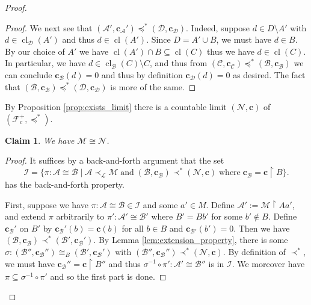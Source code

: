 \documentclass[12pt]{amsart}
\theoremstyle{plain}
\newtheorem{claim}{Claim}
\theoremstyle{definition}
\newcommand{\isom}{\cong}
\newcommand{\mcA}{\mathcal{A}}
\newcommand{\mcB}{\mathcal{B}}
\newcommand{\mcC}{\mathcal{C}}
\newcommand{\mcD}{\mathcal{D}}
\newcommand{\mcF}{\mathcal{F}}
\newcommand{\mcI}{\mathcal{I}}
\newcommand{\mcL}{\mathcal{L}}
\newcommand{\mcM}{\mathcal{M}}
\newcommand{\mcN}{\mathcal{N}}
\newcommand{\oc}{\mathbf{c}}
\DeclareMathOperator{\cl}{cl}
\begin{document}
\begin{proof}
\begin{proof}
We next see that $(\mcA', \oc_\mcA') \preceq^* (\mcD, \oc_\mcD)$.
Indeed, suppose $d \in D \setminus A'$ with $d \in \cl_\mcD(A')$ and thus $d \in \cl(A')$.
Since $D = A' \cup B$, we must have $d \in B$.
By our choice of $A'$ we have $\cl(A') \cap B \subseteq \cl(C)$ thus we have $d \in \cl(C)$.
In particular, we have $d \in \cl_\mcB(C) \setminus C$, and thus from $(\mcC, \oc_\mcC) \preceq^* (\mcB, \oc_\mcB)$ we can conclude $\oc_\mcB(d) = 0$ and thus by definition $\oc_\mcD(d) = 0$ as desired.
The fact that $(\mcB, \oc_\mcB) \preceq^* (\mcD, \oc_\mcD)$ is more of the same.
\end{proof}

By Proposition \ref{prop:exists_limit} there is a countable limit $(\mcN, \oc)$ of $(\mcF^+_c, \preceq^*)$.

\begin{claim}
We have $\mcM \isom \mcN$.
\end{claim}

\begin{proof}
It suffices by a back-and-forth argument that the set
\[ \mcI = \{\pi : \mcA \isom \mcB \mid \mcA \prec_\mcL \mcM \; \text{and} \; (\mcB, \oc_\mcB) \prec^* (\mcN, \oc) \; \text{where} \; \oc_\mcB = \oc \upharpoonright B\}.\]
has the back-and-forth property.

First, suppose we have $\pi : \mcA \isom \mcB \in \mcI$ and some $a' \in M$.
Define $\mcA' := \mcM \upharpoonright Aa'$, and extend $\pi$ arbitrarily to $\pi' : \mcA' \isom \mcB'$ where $B' = Bb'$ for some $b' \not\in B$.
Define $\oc_\mcB'$ on $B'$ by $\oc_\mcB'(b) = \oc(b)$ for all $b \in B$ and $\oc_{\mcB'}(b') = 0$.
Then we have $(\mcB, \oc_\mcB) \prec^* (\mcB', \oc_\mcB')$.
By Lemma \ref{lem:extension_property}, there is some $\sigma :  (\mcB'', \oc_\mcB'') \isom_B (\mcB', \oc_\mcB')$ with $(\mcB'', \oc_\mcB'') \prec^* (\mcN, \oc)$.
By definition of $\prec^*$, we must have $\oc_\mcB'' = \oc \upharpoonright B''$ and thus $\sigma^{-1} \circ \pi' : \mcA' \isom \mcB''$ is in $\mcI$.
We moreover have $\pi \subseteq \sigma^{-1} \circ \pi'$ and so the first part is done.


\end{proof}
\end{proof}
\end{document}
